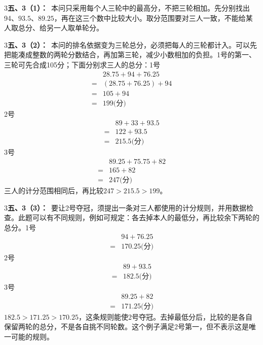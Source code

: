 \documentclass[multi=snippet,border={5bp 20bp 5bp 5bp}]{standalone}
\newenvironment{snippet}[3]{\begin{minipage}{#1bp}\color{answerred}\fontsize{#2}{#3}\selectfont\raggedright}{\end{minipage}}
\begin{document}
\begin{snippet}{505}{11.5}{14}\begin{multicols}{3}\raggedcolumns \textbf{五、3（1）：}\ 本问只采用每个人三轮中的最高分，不把三轮相加。先分别找出94、\(93.5\)\allowbreak 、\(89.25\)\allowbreak ，再在这三个数中比较大小。取分范围要对三人一致，不能给某人取总分、给另一人取单轮分。\end{multicols}\end{snippet}
\begin{snippet}{505}{11.5}{14}\begin{multicols}{3}\raggedcolumns \textbf{五、3（2）：}\ 本问的排名依据变为三轮总分，必须把每人的三轮都计入。可以先把能凑成整数的两轮分数结合，再加第三轮，减少小数相加的负担。1号的第一、三轮可先合成105分；下面分别求三人的总分：1号\[\begin{aligned}&28.75+94+76.25\\={}&(28.75+76.25)+94\\={}&105+94\\={}&199\text{(分)}\end{aligned}\]2号\[\begin{aligned}&89+33+93.5\\={}&122+93.5\\={}&215.5\text{(分)}\end{aligned}\]3号\[\begin{aligned}&89.25+75.75+82\\={}&165+82\\={}&247\text{(分)}\end{aligned}\]三人的计分范围相同后，再比较\(247>215.5>199\)\allowbreak 。\end{multicols}\end{snippet}
\begin{snippet}{505}{11.5}{14}\begin{multicols}{3}\raggedcolumns \textbf{五、3（3）：}\ 要让2号夺冠，须提出一条对三人都使用的计分规则，并用数据检查。此题可以有不同规则，例如可规定：各去掉本人的最低分，再比较余下两轮的总分。1号\[\begin{aligned}&94+76.25\\={}&170.25\text{(分)}\end{aligned}\]2号\[\begin{aligned}&89+93.5\\={}&182.5\text{(分)}\end{aligned}\]3号\[\begin{aligned}&89.25+82\\={}&171.25\text{(分)}\end{aligned}\]\(182.5>171.25>170.25\)\allowbreak ，这条规则能使2号夺冠。去掉最低分后，比较的是各自保留两轮的总分，不是各自挑不同轮数。这个例子满足2号第一，但不表示这是唯一可能的规则。\end{multicols}\end{snippet}
\end{document}
